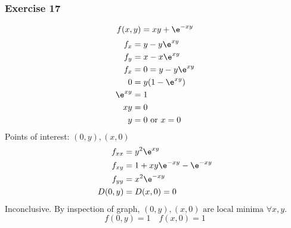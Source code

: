 \documentclass{math}
\begin{document}
\subsubsection*{Exercise 17}
\[ f(x,y) = xy+\e^{-xy} \]
\begin{align*}
  f_x &= y-y\e^{xy} \\
  f_y &= x-x\e^{xy} \\
  f_x &= 0 = y-y\e^{xy} \\
  0 &= y(1-\e^{xy}) \\
  \e^{xy} &= 1 \\
  xy &= 0 \\
  y &= 0 \text{ or } x = 0 \\
\end{align*}
Points of interest: \( (0,y), (x,0) \)
\begin{align*}
  f_{xx} &= y^2\e^{xy} \\
  f_{xy} &= 1+xy\e^{-xy}-\e^{-xy} \\
  f_{yy} &= x^2\e^{-xy} \\
  D(0,y) &= D(x,0) = 0
\end{align*}
Inconclusive. By inspection of graph, \( (0,y), (x,0) \text{ are local
minima }\forall x,y \).
\[ f(0,y) = 1 \quad f(x,0) = 1 \]
\end{document}

